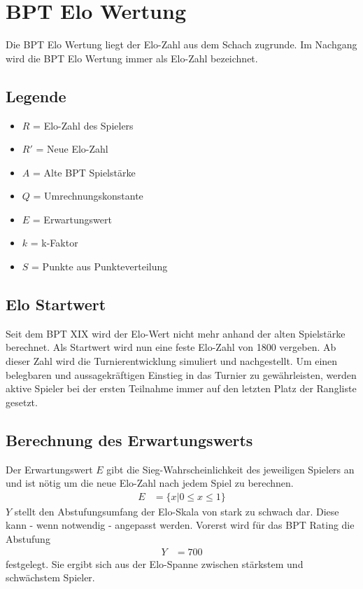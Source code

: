 \documentclass[a4paper, 12pt]{article}
\begin{document}
\newpage
\section{BPT Elo Wertung}
Die BPT Elo Wertung liegt der Elo-Zahl aus dem Schach zugrunde. Im Nachgang wird die BPT Elo Wertung immer als Elo-Zahl bezeichnet.
\subsection{Legende}
\begin{itemize}
\item \(R\) = Elo-Zahl des Spielers
\item \(R'\) = Neue Elo-Zahl
\item \(A\) = Alte BPT Spielstärke
\item \(Q\) = Umrechnungskonstante
\item \(E\) = Erwartungswert
\item \(k\) = k-Faktor
\item \(S\) = Punkte aus Punkteverteilung
\end{itemize}
\subsection{Elo Startwert}
Seit dem BPT XIX wird der Elo-Wert nicht mehr anhand der alten Spielstärke berechnet. Als Startwert wird nun eine feste Elo-Zahl von 1800 vergeben. Ab dieser Zahl wird die Turnierentwicklung simuliert und nachgestellt.
Um einen belegbaren und aussagekräftigen Einstieg in das Turnier zu gewährleisten, werden aktive Spieler bei der ersten Teilnahme immer auf den letzten Platz der Rangliste gesetzt.
\subsection{Berechnung des Erwartungswerts}
Der Erwartungswert \(E\) gibt die Sieg-Wahrscheinlichkeit des jeweiligen Spielers an und ist nötig um die neue Elo-Zahl nach jedem Spiel zu berechnen.
\begin{align}
E&=\{x|0 \leq x \leq 1\}
\end{align}
\(Y\) stellt den Abstufungsumfang der Elo-Skala von stark zu schwach dar. Diese kann - wenn notwendig - angepasst werden. Vorerst wird für das BPT Rating die Abstufung
\begin{align}
Y&=700
\end{align}
festgelegt. Sie ergibt sich aus der Elo-Spanne zwischen stärkstem und schwächstem Spieler.
\end{document}
